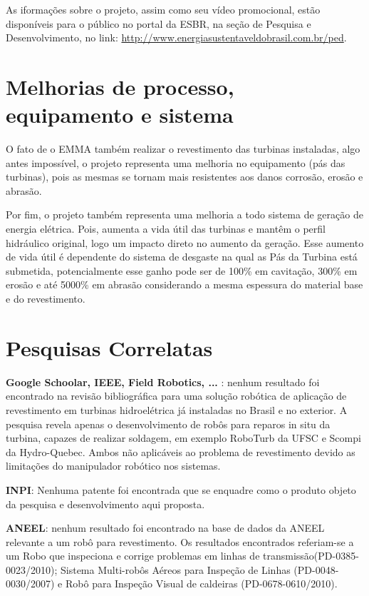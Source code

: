 As iformações sobre o projeto, assim como seu vídeo promocional, estão
disponíveis para o público no portal da ESBR, na seção de Pesquisa e
Desenvolvimento, no link:
\url{http://www.energiasustentaveldobrasil.com.br/ped}.


\section{Melhorias de processo, equipamento e sistema}

O fato de o EMMA também realizar o revestimento das turbinas instaladas, algo
antes impossível, o projeto representa uma melhoria no equipamento (pás das
turbinas), pois as mesmas se tornam mais resistentes aos danos corrosão, erosão e abrasão.

Por fim, o projeto também representa uma melhoria a todo sistema de geração de
energia elétrica. Pois, aumenta a vida útil das turbinas e mantêm o perfil
hidráulico original, logo um impacto direto no aumento da geração. Esse aumento
de vida útil é dependente do sistema de desgaste na qual as Pás da Turbina está
submetida, potencialmente esse ganho pode ser de 100\%  em cavitação,  300\% em
erosão e até 5000\% em abrasão considerando a mesma espessura do material base e
do revestimento.


\section{Pesquisas Correlatas}

\textbf{Google Schoolar, IEEE, Field Robotics, ... }: nenhum resultado foi
encontrado na revisão bibliográfica para uma solução robótica de aplicação de
revestimento em turbinas hidroelétrica já instaladas no Brasil e no exterior. A
pesquisa revela apenas o desenvolvimento de robôs para reparos in situ da
turbina, capazes de realizar soldagem, em exemplo RoboTurb da UFSC e Scompi da
Hydro-Quebec. Ambos não aplicáveis ao problema de revestimento devido as
limitações do manipulador robótico nos sistemas.

\textbf{INPI}: Nenhuma patente foi encontrada que se enquadre como o produto
objeto da pesquisa e desenvolvimento aqui proposta.

\textbf{ANEEL}: nenhum resultado foi encontrado na base de dados da ANEEL
relevante a um robô para revestimento. Os resultados encontrados referiam-se a
um Robo que inspeciona e corrige problemas em linhas de
transmissão(PD-0385-0023/2010); Sistema Multi-robôs Aéreos para Inspeção de
Linhas (PD-0048-0030/2007) e Robô para Inspeção Visual de caldeiras
(PD-0678-0610/2010).

